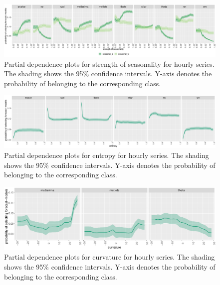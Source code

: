 \documentclass[11pt,a4paper,]{article}
\begin{document}
\begin{figure}[h]

{\centering \includegraphics[width=\textwidth]{figure/seasonalityhourly-1} 

}

\caption{Partial dependence plots for strength of seasonality for hourly series. The shading shows the 95\% confidence intervals. Y-axis denotes the probability of belonging to the corresponding class.}\label{fig:seasonalityhourly}
\end{figure}

\begin{figure}[h]

{\centering \includegraphics[width=\textwidth]{figure/entropyhourly-1} 

}

\caption{Partial dependence plots for entropy for hourly series. The shading shows the 95\% confidence intervals. Y-axis denotes the probability of belonging to the corresponding class.}\label{fig:entropyhourly}
\end{figure}

\begin{figure}[h]

{\centering \includegraphics[width=\textwidth]{figure/curvaturehourly-1} 

}

\caption{Partial dependence plots for curvature for hourly series. The shading shows the 95\% confidence intervals. Y-axis denotes the probability of belonging to the corresponding class.}\label{fig:curvaturehourly}
\end{figure}
\end{document}
